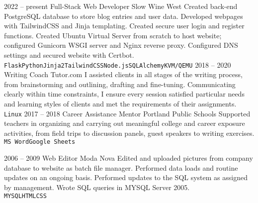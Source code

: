 \documentclass[9pt]{developercv} %
\begin{document}
\begin{entrylist}
		\entry
		{2022 -- present}
		{Full-Stack Web Developer}
		{Slow Wine West}
		{Created back-end PostgreSQL database to store blog entries and user data. Developed webpages with TailwindCSS and
		Jinja templating. Created secure user login and register functions. Created Ubuntu Virtual Server from scratch to host
		website; configured Gunicorn WSGI server and Nginx reverse proxy. Configured DNS settings and secured website with 
		Certbot.
		\\ \texttt{Flask}\slashsep\texttt{Python}\slashsep\texttt{Jinja2}\slashsep\texttt{TailwindCSS}\slashsep\texttt{Node.js}\slashsep\texttt{SQLAlchemy}\slashsep\texttt{KVM/QEMU}}
	\entry
		{2018 -- 2020}
		{Writing Coach}
		{Tutor.com}
		{I assisted clients in all stages of the writing process, from
		brainstorming and outlining, drafting and fine-tuning. Communicating clearly
		within time constraints, I ensure every session satisfied particular needs and
		learning styles of clients and met the requirements of their assignments.
		\\ \texttt{Linux}}
	\entry
		{2017 -- 2018}
		{Career Assistance Mentor}
		{Portland Public Schools}
		{Supported teachers in organizing and carrying out meaningful college and
		career exposure activities, from field trips to discussion panels, guest
		speakers to writing exercises.
		\\ \texttt{MS Word}\slashsep\texttt{Google Sheets}}
		
	\entry
		{2006 -- 2009}
		{Web Editor}
		{Moda Nova}
		{Edited and uploaded pictures from company database to website as batch file manager. Performed data loads and routine updates on an ongoing basis. 
		Performed updates to the SQL system as assigned by management.		
		Wrote SQL queries in MYSQL Server 2005.
		\\ \texttt{MYSQL}\slashsep\texttt{HTML}\slashsep\texttt{CSS}}
\end{entrylist}
\end{document}
